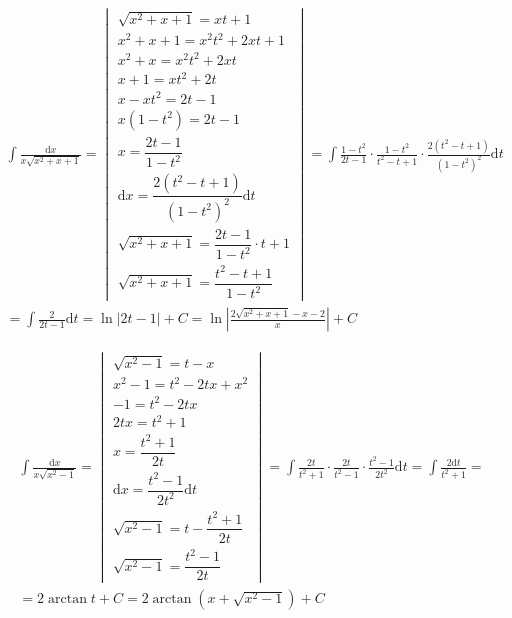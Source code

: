 
\begin{gather*}
\int{\frac{\mbox{d}x}{x\sqrt{x^2+x+1}}} =
\begin{vmatrix}
  \sqrt{x^2+x+1}=xt+1\\
  x^2+x+1=x^2t^2+2xt+1\\
  x^2+x=x^2t^2+2xt\\
  x+1=xt^2+2t\\
  x-xt^2=2t-1\\
  x(1-t^2)=2t-1\\
  x=\dfrac{2t-1}{1-t^2}\\
  \mbox{d}x=\dfrac{2(t^2-t+1)}{(1-t^2)^2}\mbox{d}t\\
  \sqrt{x^2+x+1} = \dfrac{2t-1}{1-t^2} \cdot t+1 \\
  \sqrt{x^2+x+1} = \dfrac{t^2-t+1}{1-t^2}
\end{vmatrix}
= \int{\frac{1-t^2}{2t-1}\cdot \frac{1-t^2}{t^2-t+1}\cdot \frac{2(t^2-t+1)}{\left(1-t^2\right)^2}\mbox{d}t} \\
= \int{\frac{2}{2t-1}\mbox{d}t}
= \ln{\left|2t-1\right|}+C = \ln{\left|\frac{2\sqrt{x^2+x+1}-x-2}{x}\right|}+C
\end{gather*}


\begin{gather*}
\int{\frac{\mbox{d}x}{x\sqrt{x^2-1}}} =
\begin{vmatrix}
  \sqrt{x^2-1}=t-x\\
  x^2-1=t^2-2tx+x^2\\
  -1=t^2-2tx\\
  2tx=t^2+1\\
  x=\dfrac{t^2+1}{2t}\\
  \mbox{d}x=\dfrac{t^2-1}{2t^2}\mbox{d}t\\
  \sqrt{x^2-1}=t-\dfrac{t^2+1}{2t} \\
  \sqrt{x^2-1}=\dfrac{t^2-1}{2t}
\end{vmatrix}
= \int{\frac{2t}{t^2+1}\cdot\frac{2t}{t^2-1}\cdot\frac{t^2-1}{2t^2}\mbox{d}t}
= \int{\frac{2\mbox{d}t}{t^2+1}} = \\
= 2\arctan{t}+C
= 2\arctan{(x+\sqrt{x^2-1})}+C
\end{gather*}



